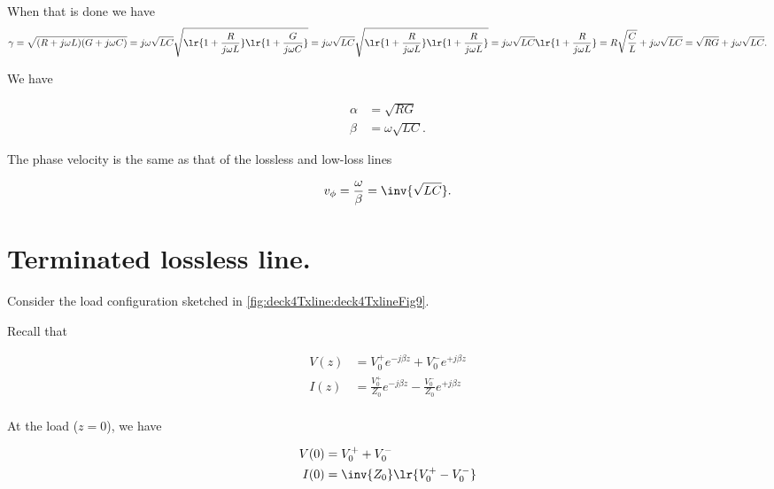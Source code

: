 When that is done we have
\begin{dmath}\label{eqn:uwaves4TransmissionLines:780}
\gamma
= \sqrt{ (R + j \omega L) ( G + j \omega C ) }
= j \omega \sqrt{L C} \sqrt{
\lr{ 1 + \frac{R}{j \omega L} }
\lr{ 1 + \frac{G}{j \omega C} }
}
= j \omega \sqrt{L C} \sqrt{
\lr{ 1 + \frac{R}{j \omega L} }
\lr{ 1 + \frac{R}{j \omega L} }
}
= j \omega \sqrt{L C}
\lr{ 1 + \frac{R}{j \omega L} }
= R \sqrt{\frac{C}{L} }
+ j \omega \sqrt{L C}
= \sqrt{R G }
+ j \omega \sqrt{L C}.
\end{dmath}

We have

\begin{equation}\label{eqn:uwaves4TransmissionLines:800}
\begin{aligned}
\alpha &= \sqrt{R G } \\
\beta &= \omega \sqrt{L C}.
\end{aligned}
\end{equation}

The phase velocity is the same as that of the lossless and low-loss lines

\begin{equation}\label{eqn:uwaves4TransmissionLines:820}
v_\phi = \frac{\omega}{\beta} = \inv{\sqrt{L C}}.
\end{equation}

\section{Terminated lossless line.}

Consider the load configuration sketched in \cref{fig:deck4Txline:deck4TxlineFig9}.


Recall that

\begin{equation}\label{eqn:uwaves4TransmissionLines:840}
\begin{aligned}
V(z) &= V_0^{+} e^{-j \beta z} + V_0^{-} e^{+j \beta z} \\
I(z) &= \frac{V_0^{+}}{Z_0} e^{-j \beta z} - \frac{V_0^{-}}{Z_0} e^{+j \beta z} \\
\end{aligned}
\end{equation}

At the load (\( z = 0 \)), we have

\begin{equation}\label{eqn:uwaves4TransmissionLines:860}
\begin{aligned}
V(0) &= V_0^{+} + V_0^{-} \\
I(0) &= \inv{Z_0} \lr{ V_0^{+} - V_0^{-} }
\end{aligned}
\end{equation}

